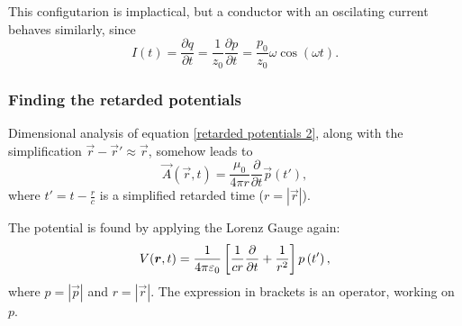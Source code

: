         This configutarion is implactical, but a conductor with an oscilating current behaves similarly, since
        \begin{equation*}
            I(t) = \frac{\partial q}{\partial t} = \frac{1}{z_0} \frac{\partial p}{\partial t} = \frac{p_0}{z_0}\omega\cos\left(\omega t\right).
        \end{equation*}
    
    \subsubsection*{Finding the retarded potentials}
        Dimensional analysis of equation \eqref{retarded potentials 2}, along with the simplification $\vec{r} - \vec{r}' \approx \vec{r}$, 
        somehow leads to 
        \begin{equation}
            \vec{A}\left(\vec{r}, t\right) = \frac{\mu_0}{4\pi r} \frac{\partial }{\partial t}\vec{p}\left(t'\right),
        \end{equation} 
        where $t' = t - \frac{{r}}{c}$ is a simplified retarded time ($r = |\vec{r}|$).

        The potential is found by applying the Lorenz Gauge again:
        \begin{equation}
            V(\bm{r}, t) = \frac{1}{4\pi\varepsilon_0}
            \left[\frac{1}{cr}\frac{\partial}{\partial t} + \frac{1}{r^2} \right]
            p\left(t'\right),
        \end{equation}
        where $p = |\vec{p}|$ and $r = |\vec{r}|$. The expression in brackets is an operator, working on $p$.

